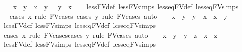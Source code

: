 \begin{isabellebody}
\ \ \isamarkupfalse%
\ {\isachardoublequoteopen}{\isacharparenleft}{\kern0pt}x\ {\isacharless}{\kern0pt}\ y{\isacharparenright}{\kern0pt}\ {\isacharequal}{\kern0pt}\ {\isacharparenleft}{\kern0pt}x\ {\isasymle}\ y\ {\isasymand}\ {\isasymnot}\ y\ {\isasymle}\ x{\isacharparenright}{\kern0pt}{\isachardoublequoteclose}\isanewline
\ \ \isamarkupfalse%
\ less{\isacharunderscore}{\kern0pt}FV{\isacharunderscore}{\kern0pt}def\ less{\isacharunderscore}{\kern0pt}FV{\isachardot}{\kern0pt}simps\ less{\isacharunderscore}{\kern0pt}eq{\isacharunderscore}{\kern0pt}FV{\isacharunderscore}{\kern0pt}def\ less{\isacharunderscore}{\kern0pt}eq{\isacharunderscore}{\kern0pt}FV{\isachardot}{\kern0pt}simps\ \isanewline
\ \ \isamarkupfalse%
{\isacharparenleft}{\kern0pt}cases\ x\ rule{\isacharcolon}{\kern0pt}\ FV{\isacharunderscore}{\kern0pt}cases{\isacharparenright}{\kern0pt}\ {\isacharparenleft}{\kern0pt}cases\ y\ rule{\isacharcolon}{\kern0pt}\ FV{\isacharunderscore}{\kern0pt}cases{\isacharcomma}{\kern0pt}\ auto{\isacharparenright}{\kern0pt}\isanewline
\ \ \isamarkupfalse%
\ {\isachardoublequoteopen}x\ {\isasymle}\ y\ {\isasymLongrightarrow}\ y\ {\isasymle}\ x\ {\isasymLongrightarrow}\ x\ {\isacharequal}{\kern0pt}\ y{\isachardoublequoteclose}\isanewline
\ \ \isamarkupfalse%
\ less{\isacharunderscore}{\kern0pt}FV{\isacharunderscore}{\kern0pt}def\ less{\isacharunderscore}{\kern0pt}FV{\isachardot}{\kern0pt}simps\ less{\isacharunderscore}{\kern0pt}eq{\isacharunderscore}{\kern0pt}FV{\isacharunderscore}{\kern0pt}def\ less{\isacharunderscore}{\kern0pt}eq{\isacharunderscore}{\kern0pt}FV{\isachardot}{\kern0pt}simps\ \isanewline
\ \ \isamarkupfalse%
\ {\isacharparenleft}{\kern0pt}cases\ x\ rule{\isacharcolon}{\kern0pt}\ FV{\isacharunderscore}{\kern0pt}cases{\isacharparenright}{\kern0pt}{\isacharparenleft}{\kern0pt}cases\ y\ rule{\isacharcolon}{\kern0pt}\ FV{\isacharunderscore}{\kern0pt}cases{\isacharcomma}{\kern0pt}\ auto{\isacharparenright}{\kern0pt}{\isacharplus}{\kern0pt}\isanewline
\ \ \isamarkupfalse%
\ {\isachardoublequoteopen}x\ {\isasymle}\ y\ {\isasymLongrightarrow}\ y\ {\isasymle}\ z\ {\isasymLongrightarrow}\ x\ {\isasymle}\ z{\isachardoublequoteclose}\isanewline
\ \ \isamarkupfalse%
\ less{\isacharunderscore}{\kern0pt}FV{\isacharunderscore}{\kern0pt}def\ less{\isacharunderscore}{\kern0pt}FV{\isachardot}{\kern0pt}simps\ less{\isacharunderscore}{\kern0pt}eq{\isacharunderscore}{\kern0pt}FV{\isacharunderscore}{\kern0pt}def\ less{\isacharunderscore}{\kern0pt}eq{\isacharunderscore}{\kern0pt}FV{\isachardot}{\kern0pt}simps\ \isanewline

\end{isabellebody}
